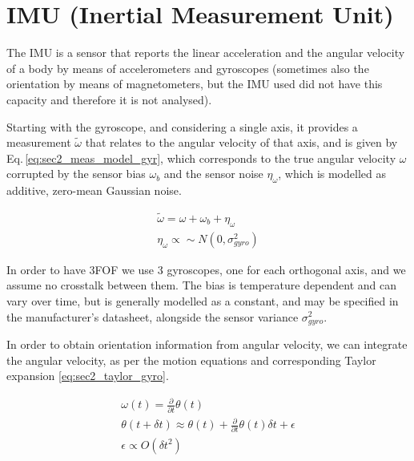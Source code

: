 \section{IMU (Inertial Measurement Unit)}
\label{sec:sec2_imu}

The IMU is a sensor that reports the linear acceleration and the angular velocity of a body by means of accelerometers and gyroscopes (sometimes also the orientation by means of magnetometers, but the IMU used did not have this capacity and therefore it is not analysed).

Starting with the gyroscope, and considering a single axis, it provides a measurement $\tilde{\omega}$ that relates to the angular velocity of that axis, and is given by Eq.\,\eqref{eq:sec2_meas_model_gyr}, which corresponds to the true angular velocity $\omega$ corrupted by the sensor bias $\omega_b$ and the sensor noise $\eta_{\omega}$, which is modelled as additive, zero-mean Gaussian noise.

\begin{equation}
    \label{eq:sec2_meas_model_gyr}
    \begin{split}
        \tilde{\omega} = \omega + \omega_b + \eta_\omega\\
        \eta_{\omega} \propto \sim N\left( 0, \sigma_{gyro}^2 \right)
    \end{split}
\end{equation}

In order to have 3FOF we use 3 gyroscopes, one for each orthogonal axis, and we assume no crosstalk between them. The bias is temperature dependent and can vary over time, but is generally modelled as a constant, and may be specified in the manufacturer's datasheet, alongside the sensor variance $\sigma_{gyro}^2$.

In order to obtain orientation information from angular velocity, we can integrate the angular velocity, as per the motion equations and corresponding Taylor expansion \eqref{eq:sec2_taylor_gyro}.

\begin{equation}
    \label{eq:sec2_taylor_gyro}
    \begin{split}
        \omega(t) = \frac{\partial}{\partial t} \theta(t) \\
        \theta(t+\delta t) \approx \theta(t) + \frac{\partial}{\partial t} \theta(t) \delta t + \epsilon\\
        \epsilon \propto O(\delta t^2)
    \end{split}
\end{equation}

